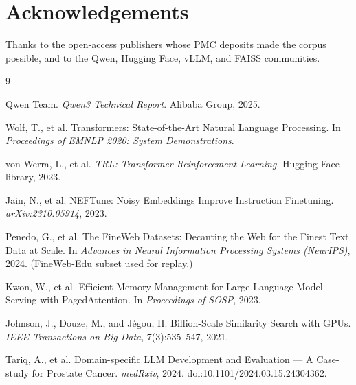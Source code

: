 \documentclass[11pt]{article}
\begin{document}
\section*{Acknowledgements}

Thanks to the open-access publishers whose PMC deposits made the corpus
possible, and to the Qwen, Hugging Face, vLLM, and FAISS communities.

\begin{thebibliography}{9}

Qwen Team.
\newblock \emph{Qwen3 Technical Report}.
\newblock Alibaba Group, 2025.

Wolf, T., et al.
\newblock Transformers: State-of-the-Art Natural Language Processing.
\newblock In \emph{Proceedings of EMNLP 2020: System Demonstrations}.

von Werra, L., et al.
\newblock \emph{TRL: Transformer Reinforcement Learning}.
\newblock Hugging Face library, 2023.

Jain, N., et al.
\newblock NEFTune: Noisy Embeddings Improve Instruction Finetuning.
\newblock \emph{arXiv:2310.05914}, 2023.

Penedo, G., et al.
\newblock The FineWeb Datasets: Decanting the Web for the Finest Text Data
at Scale.
\newblock In \emph{Advances in Neural Information Processing Systems
(NeurIPS)}, 2024.
\newblock (FineWeb-Edu subset used for replay.)

Kwon, W., et al.
\newblock Efficient Memory Management for Large Language Model Serving
with PagedAttention.
\newblock In \emph{Proceedings of SOSP}, 2023.

Johnson, J., Douze, M., and J\'egou, H.
\newblock Billion-Scale Similarity Search with GPUs.
\newblock \emph{IEEE Transactions on Big Data}, 7(3):535--547, 2021.

Tariq, A., et al.
\newblock Domain-specific LLM Development and Evaluation --- A
Case-study for Prostate Cancer.
\newblock \emph{medRxiv}, 2024.
\newblock doi:10.1101/2024.03.15.24304362.

\end{thebibliography}
\end{document}
